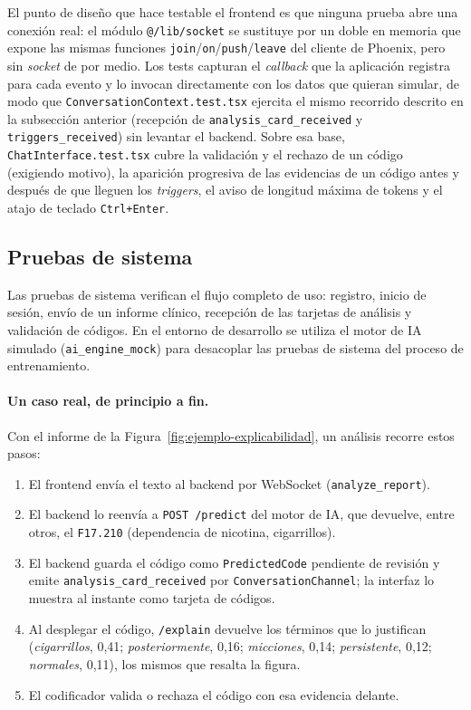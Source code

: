 El punto de diseño que hace testable el frontend es que ninguna prueba abre una conexión real: el módulo \texttt{@/lib/socket} se sustituye por un doble en memoria que expone las mismas funciones \texttt{join}/\texttt{on}/\texttt{push}/\texttt{leave} del cliente de Phoenix, pero sin \emph{socket} de por medio. Los tests capturan el \emph{callback} que la aplicación registra para cada evento y lo invocan directamente con los datos que quieran simular, de modo que \texttt{ConversationContext.test.tsx} ejercita el mismo recorrido descrito en la subsección anterior (recepción de \texttt{analysis\_card\_received} y \texttt{triggers\_received}) sin levantar el backend. Sobre esa base, \texttt{ChatInterface.test.tsx} cubre la validación y el rechazo de un código (exigiendo motivo), la aparición progresiva de las evidencias de un código antes y después de que lleguen los \emph{triggers}, el aviso de longitud máxima de tokens y el atajo de teclado \texttt{Ctrl+Enter}.

\subsection{Pruebas de sistema}

Las pruebas de sistema verifican el flujo completo de uso: registro, inicio de sesión, envío de un informe clínico, recepción de las tarjetas de análisis y validación de códigos. En el entorno de desarrollo se utiliza el motor de IA simulado (\texttt{ai\_engine\_mock}) para desacoplar las pruebas de sistema del proceso de entrenamiento.

\paragraph{Un caso real, de principio a fin.} Con el informe de la Figura~\ref{fig:ejemplo-explicabilidad}, un análisis recorre estos pasos:

\begin{enumerate}
 \item El frontend envía el texto al backend por WebSocket (\texttt{analyze\_report}).
 \item El backend lo reenvía a \texttt{POST /predict} del motor de IA, que devuelve, entre otros, el \texttt{F17.210} (dependencia de nicotina, cigarrillos).
 \item El backend guarda el código como \texttt{PredictedCode} pendiente de revisión y emite \texttt{analysis\_card\_received} por \texttt{ConversationChannel}; la interfaz lo muestra al instante como tarjeta de códigos.
 \item Al desplegar el código, \texttt{/explain} devuelve los términos que lo justifican (\emph{cigarrillos}, 0,41; \emph{posteriormente}, 0,16; \emph{micciones}, 0,14; \emph{persistente}, 0,12; \emph{normales}, 0,11), los mismos que resalta la figura.
 \item El codificador valida o rechaza el código con esa evidencia delante.
\end{enumerate}

